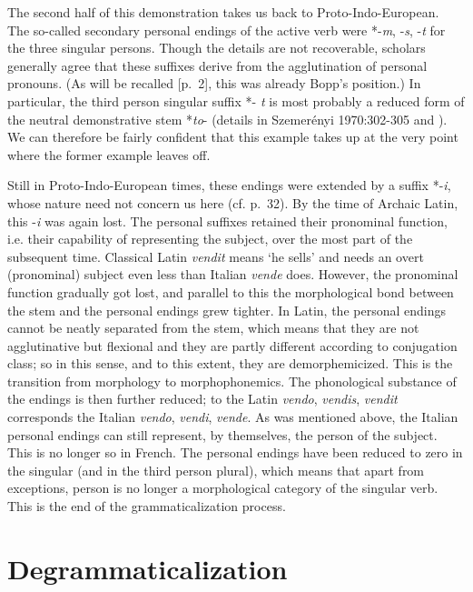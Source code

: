 The second half of this demonstration takes us back to Proto-Indo-European. The so-called secondary personal endings of the active verb were *-\textit{m}, -\textit{s}, -\textit{t} for the three singular persons. Though the details are not recoverable, scholars generally agree that these suffixes derive from the agglutination of personal pronouns. (As will be recalled [p.~2], this was already Bopp's position.) In particular, the third person singular suffix *- \textit{t} is most probably a reduced form of the neutral demonstrative stem *\textit{to}{}- (details in Szemerényi 1970:302-305 and \citet{Seebold1971}). We can therefore be fairly confident that this example takes up at the very point where the former example leaves off.

Still in Proto-Indo-European times, these endings were extended by a suffix *-\textit{i}, whose nature need not concern us here (cf. p.~32). By the time of Archaic Latin, this -\textit{i} was again lost. The personal suffixes retained their pronominal function, i.e. their capability of representing the subject, over the most part of the subsequent time. Classical Latin \textit{vendit} means ‘he sells’ and needs an overt (pronominal) subject even less than Italian \textit{vende} does. However, the pronominal function gradually got lost, and parallel to this the morphological bond between the stem and the personal endings grew tighter. In Latin, the personal endings cannot be neatly separated from the stem, which means that they are not agglutinative but flexional and they are partly different according to conjugation class; so in this sense, and to this extent, they are demorphemicized. This is the transition from morphology to morphophonemics. The phonological substance of the endings is then further reduced; to the Latin \textit{vendo}, \textit{vendis},\textit{ vendit} corresponds the Italian \textit{vendo}, \textit{vendi}, \textit{vende}. As was mentioned above, the Italian personal endings can still represent, by themselves, the person of the subject. This is no longer so in French. The personal endings have been reduced to zero in the singular (and in the third person plural), which means that apart from exceptions, person is no longer a morphological category of the singular verb. This is the end of the grammaticalization process.

\section{Degrammaticalization}

